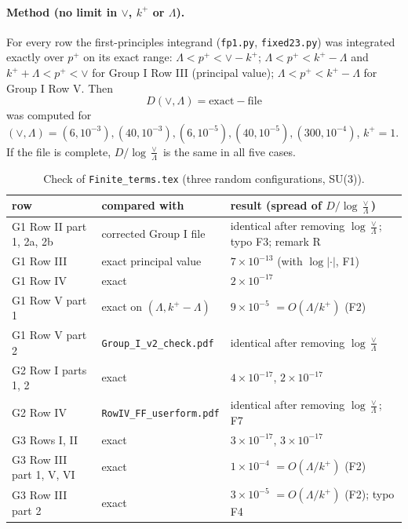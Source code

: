 \documentclass[10pt]{article}
\numberwithin{equation}{section}
\begin{document}
\paragraph{Method (no limit in $\vee$, $k^+$ or $\Lambda$).} For every row the first-principles integrand (\texttt{fp1.py}, \texttt{fixed23.py}) was integrated exactly over $p^+$ on its exact range: $\Lambda<p^+<\vee-k^+$; $\Lambda<p^+<k^+-\Lambda$ and $k^++\Lambda<p^+<\vee$ for Group I Row III (principal value); $\Lambda<p^+<k^+-\Lambda$ for Group I Row V. Then
\begin{equation*}
D(\vee,\Lambda)=\text{exact}-\text{file}
\end{equation*}
was computed for $(\vee,\Lambda)=(6,10^{-3}),(40,10^{-3}),(6,10^{-5}),(40,10^{-5}),(300,10^{-4})$, $k^+=1$. If the file is complete, $D/\log\frac{\vee}{\Lambda}$ is the same in all five cases.
\begin{table}[H]\centering\small
\caption{Check of \texttt{Finite\_terms.tex} (three random configurations, SU(3)).}\label{tab:check}
\begin{tabular}{@{}>{\raggedright\arraybackslash}p{}>{\raggedright\arraybackslash}p{}>{\raggedright\arraybackslash}p{}@{}}\toprule
row & compared with & result (spread of $D/\log\frac\vee\Lambda$)\\\midrule
G1 Row II part 1, 2a, 2b & corrected Group I file & identical after removing $\log\frac\vee\Lambda$; typo F3; remark R\\
G1 Row III & exact principal value & $7\times10^{-13}$ (with $\log|\cdot|$, F1)\\
G1 Row IV & exact & $2\times10^{-17}$\\
G1 Row V part 1 & exact on $(\Lambda,k^+-\Lambda)$ & $9\times10^{-5}$ $=O(\Lambda/k^+)$ (F2)\\
G1 Row V part 2 & \texttt{Group\_I\_v2\_check.pdf} & identical after removing $\log\frac\vee\Lambda$\\
G2 Row I parts 1, 2 & exact & $4\times10^{-17}$, $2\times10^{-17}$\\
G2 Row IV & \texttt{RowIV\_FF\_userform.pdf} & identical after removing $\log\frac\vee\Lambda$; F7\\
G3 Rows I, II & exact & $3\times10^{-17}$, $3\times10^{-17}$\\
G3 Row III part 1, V, VI & exact & $1\times10^{-4}$ $=O(\Lambda/k^+)$ (F2)\\
G3 Row III part 2 & exact & $3\times10^{-5}$ $=O(\Lambda/k^+)$ (F2); typo F4\\\bottomrule
\end{tabular}
\end{table}
\end{document}
